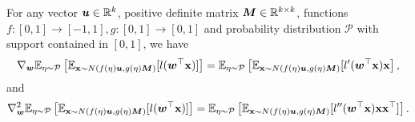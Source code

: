 \begin{lemma}\label{lemma:gradient&hessian}
For any vector ${\bm{u}} \in \mathbb{R}^k$, positive definite matrix ${\bm{M}} \in \mathbb{R}^{k \times k}$, functions $f :[0,1] \rightarrow [-1,1], g: [0,1] \rightarrow [0,1]$ and probability distribution $\mathcal{P}$ with support contained in $[0,1]$, we have
\begin{equation*}
    \nabla_{\bm{w}} \mathbb{E}_{\eta \sim \mathcal{P}} \left [\mathbb{E}_{{\mathbf{x}} \sim N(f(\eta){\bm{u}}, g(\eta){\bm{M}})}[l({\bm{w}}^\top {\mathbf{x}})] \right ]
    = \mathbb{E}_{\eta \sim \mathcal{P}} \left [\mathbb{E}_{{\mathbf{x}} \sim N(f(\eta){\bm{u}}, g(\eta){\bm{M}})}[l'({\bm{w}}^\top {\mathbf{x}}){\mathbf{x}} \right ],
\end{equation*}
and
\begin{equation*}
    \nabla_{\bm{w}}^2 \mathbb{E}_{\eta \sim \mathcal{P}} \left [\mathbb{E}_{{\mathbf{x}} \sim N(f(\eta){\bm{u}}, g(\eta){\bm{M}})}[l({\bm{w}}^\top {\mathbf{x}})] \right ]
    = \mathbb{E}_{\eta \sim \mathcal{P}} \left [\mathbb{E}_{{\mathbf{x}} \sim N(f(\eta){\bm{u}}, g(\eta){\bm{M}})}[l''({\bm{w}}^\top {\mathbf{x}}) {\mathbf{x}} {\mathbf{x}}^\top] \right ].
\end{equation*}
\end{lemma}
